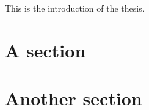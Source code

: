 This is the introduction of the thesis.

\lipsum[1]

\section{A section}
\lipsum[2]

\section{Another section}
\lipsum[3]
